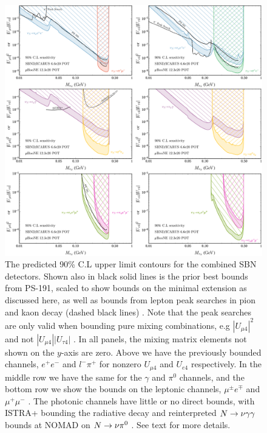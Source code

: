 \documentclass[11pt, a4paper]{article}
\def\ster{\ensuremath N}
\begin{document}
\begin{figure}[t]
\center
\includegraphics[width=1.0\textwidth]{figures/band_sbn_new.pdf}

\caption{\label{fig:band_sbn}The predicted  90\% C.L  upper limit contours for
the combined SBN detectors. Shown also in black solid lines is the prior best
bounds from PS-191, scaled to show bounds on the minimal extension as discussed
here, as well as bounds from lepton peak searches in pion and kaon decay
\cite{PhysRevD.46.R885,PhysRevLett.68.3000} (dashed black lines) . Note that the
peak searches are only valid when bounding pure mixing combinations, e.g
$|U_{\mu 4}|^2$ and not $|U_{\mu 4}||U_{\tau 4}|$ . In all panels, the mixing
matrix elements not shown on the $y$-axis are zero. Above we have the
previously bounded channels, $e^+e^-$ and $l^- \pi^+$ for nonzero $U_{\mu 4}$
and $U_{e4}$ respectively. In the middle row we have the same for the $\gamma$
and $\pi^0$ channels, and the bottom row we show the bounds on the leptonic
channels, $\mu^\pm e^\mp$ and $\mu^+ \mu^-$  . The photonic channels have
little or no direct bounds, with ISTRA+ bounding the radiative
decay \cite{Duk:2011yv} and reinterpreted $\ster \rightarrow \nu \gamma \gamma$
bounds at NOMAD on $\ster \rightarrow \nu \pi^0$ \cite{Gninenko:1998nn}. See
text for more details. }

\end{figure}
\end{document}
